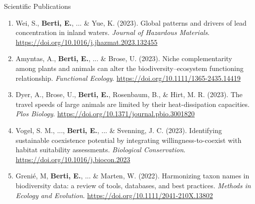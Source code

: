 \documentclass{resume} %
\begin{document}
\begin{rSection}{Scientific Publications}
\begin{enumerate}[leftmargin=0pt]
    \item{Wei, S., \textbf{Berti, E.}, ... \& Yue, K. (2023). Global patterns and drivers of lead concentration in inland waters. \textit{Journal of Hazardous Materials}. \url{https://doi.org/10.1016/j.jhazmat.2023.132455}}
    \item{Amyntas, A., \textbf{Berti, E.}, ... \& Brose, U. (2023). Niche complementarity among plants and animals can alter the biodiversity–ecosystem functioning relationship. \textit{Functional Ecology}. \url{https://doi.org/10.1111/1365-2435.14419}}
    \item{Dyer, A., Brose, U., \textbf{Berti, E.}, Rosenbaum, B., \& Hirt, M. R. (2023). The travel speeds of large animals are limited by their heat-dissipation capacities. \textit{Plos Biology}. \url{https://doi.org/10.1371/journal.pbio.3001820}}
    \item{Vogel, S. M., ..., \textbf{Berti, E.}, ... \& Svenning, J. C. (2023). Identifying sustainable coexistence potential by integrating willingness-to-coexist with habitat suitability assessments. \textit{Biological Conservation}. \href{https://doi.org/10.1016/j.biocon.2023.109935}{https://doi.org/10.1016/j.biocon.2023}}
    \item{Grenié, M, \textbf{Berti, E.}, ... \& Marten, W. (2022). Harmonizing taxon names in biodiversity data: a review of tools, databases, and best practices. \textit{Methods in Ecology and Evolution}. \url{https://doi.org/10.1111/2041-210X.13802}}
\end{enumerate}
\end{rSection}
\end{document}

